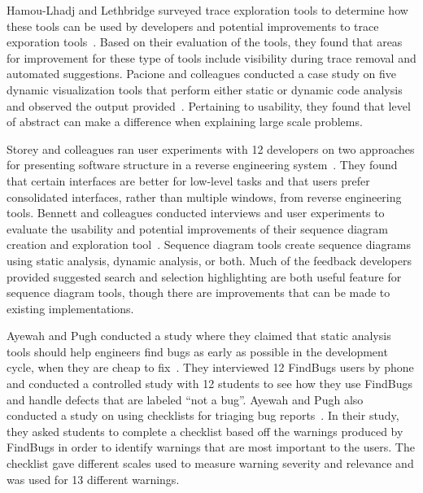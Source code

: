 \documentclass{llncs}
\begin{document}
Hamou-Lhadj and Lethbridge surveyed trace exploration tools to determine how these tools 
can be used by developers and potential improvements to trace exporation tools~\cite{hamou2004survey}. 
Based on their evaluation of the tools, they found that areas 
for improvement for these type of tools include visibility during trace removal and automated suggestions.
Pacione and colleagues conducted a case study on five dynamic visualization tools that perform either static or dynamic code analysis and observed the output provided~\cite{pacione2003comparative}. Pertaining to usability, they found that level of abstract can make a difference when explaining large scale problems.

Storey and colleagues ran user experiments with 12 developers on two approaches for presenting software structure in a reverse engineering system~\cite{storey1997rigi}. They found that certain interfaces are better for low-level tasks and that users prefer consolidated interfaces, rather than multiple windows, from reverse engineering tools.
Bennett and colleagues conducted interviews and user experiments to evaluate the usability and potential improvements of their sequence diagram creation and exploration tool~\cite{bennett2008survey}. Sequence diagram tools create sequence diagrams using static analysis, dynamic analysis, or both.
Much of the feedback developers provided suggested search and selection highlighting are both useful feature for sequence diagram tools, though there are improvements that can be made to existing implementations.


Ayewah and Pugh conducted a study where they claimed that static analysis tools
should help engineers find bugs as early as possible in the development cycle,
when they are cheap to fix~\cite{Ayewah:2008:FBSurvey}. They interviewed 12
FindBugs users by phone and conducted a controlled study with 12 students to see
how they use FindBugs and handle defects that are labeled ``not a bug''. 
Ayewah and Pugh also conducted a study on using checklists for triaging bug
reports~\cite{Ayewah:2009:Checklists}. In their study, they asked students to
complete a checklist based off the warnings produced by FindBugs in order to
identify warnings that are most important to the users. The checklist gave
different scales used to measure warning severity and relevance and was used
for 13 different warnings.
\end{document}
